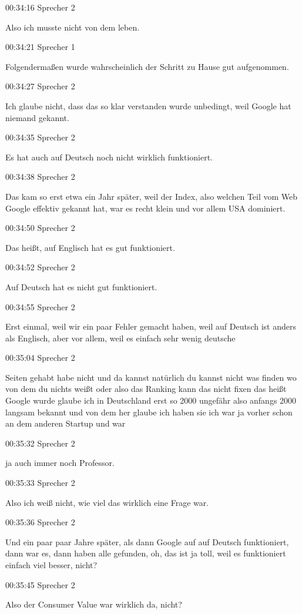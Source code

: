 00:34:16 Sprecher 2

Also ich musste nicht von dem leben.

00:34:21 Sprecher 1

Folgendermaßen wurde wahrscheinlich der Schritt zu Hause gut
aufgenommen.

00:34:27 Sprecher 2

Ich glaube nicht, dass das so klar verstanden wurde unbedingt, weil
Google hat niemand gekannt.

00:34:35 Sprecher 2

Es hat auch auf Deutsch noch nicht wirklich funktioniert.

00:34:38 Sprecher 2

Das kam so erst etwa ein Jahr später, weil der Index, also welchen Teil
vom Web Google effektiv gekannt hat, war es recht klein und vor allem
USA dominiert.

00:34:50 Sprecher 2

Das heißt, auf Englisch hat es gut funktioniert.

00:34:52 Sprecher 2

Auf Deutsch hat es nicht gut funktioniert.

00:34:55 Sprecher 2

Erst einmal, weil wir ein paar Fehler gemacht haben, weil auf Deutsch
ist anders als Englisch, aber vor allem, weil es einfach sehr wenig
deutsche

00:35:04 Sprecher 2

Seiten gehabt habe nicht und da kannst natürlich du kannst nicht was
finden wo von dem du nichts weißt oder also das Ranking kann das nicht
fixen das heißt Google wurde glaube ich in Deutschland erst so 2000
ungefähr also anfangs 2000 langsam bekannt und von dem her glaube ich
haben sie ich war ja vorher schon an dem anderen Startup und war

00:35:32 Sprecher 2

ja auch immer noch Professor.

00:35:33 Sprecher 2

Also ich weiß nicht, wie viel das wirklich eine Frage war.

00:35:36 Sprecher 2

Und ein paar paar Jahre später, als dann Google auf auf Deutsch
funktioniert, dann war es, dann haben alle gefunden, oh, das ist ja
toll, weil es funktioniert einfach viel besser, nicht?

00:35:45 Sprecher 2

Also der Consumer Value war wirklich da, nicht?

